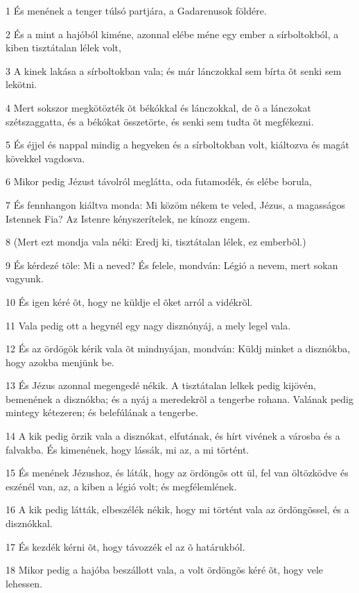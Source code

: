 \par 1 És menének a tenger túlsó partjára, a Gadarenusok földére.
\par 2 És a mint a hajóból kiméne, azonnal elébe méne egy ember a sírboltokból, a kiben tisztátalan lélek volt,
\par 3 A kinek lakása a sírboltokban vala; és már lánczokkal sem bírta õt senki sem lekötni.
\par 4 Mert sokszor megkötözték õt békókkal és lánczokkal, de õ a lánczokat szétszaggatta, és a békókat összetörte, és senki sem tudta õt megfékezni.
\par 5 És éjjel és nappal mindig a hegyeken és a sírboltokban volt, kiáltozva és magát kövekkel vagdosva.
\par 6 Mikor pedig Jézust távolról meglátta, oda futamodék, és elébe borula,
\par 7 És fennhangon kiáltva monda: Mi közöm nékem te veled, Jézus, a magasságos Istennek Fia? Az Istenre kényszerítelek, ne kínozz engem.
\par 8 (Mert ezt mondja vala néki: Eredj ki, tisztátalan lélek, ez emberbõl.)
\par 9 És kérdezé tõle: Mi a neved? És felele, mondván: Légió a nevem, mert sokan vagyunk.
\par 10 És igen kéré õt, hogy ne küldje el õket arról a vidékrõl.
\par 11 Vala pedig ott a hegynél egy nagy disznónyáj, a mely legel vala.
\par 12 És az ördögök kérik vala õt mindnyájan, mondván: Küldj minket a disznókba, hogy azokba menjünk be.
\par 13 És Jézus azonnal megengedé nékik. A tisztátalan lelkek pedig kijövén, bemenének a disznókba; és a nyáj a meredekrõl a tengerbe rohana. Valának pedig mintegy kétezeren; és belefúlának a tengerbe.
\par 14 A kik pedig õrzik vala a disznókat, elfutának, és hírt vivének a városba és a falvakba. És kimenének, hogy lássák, mi az, a mi történt.
\par 15 És menének Jézushoz, és láták, hogy az ördöngõs ott ül, fel van öltözködve és eszénél van, az, a kiben a légió volt; és megfélemlének.
\par 16 A kik pedig látták, elbeszélék nékik, hogy mi történt vala az ördöngõssel, és a disznókkal.
\par 17 És kezdék kérni õt, hogy távozzék el az õ határukból.
\par 18 Mikor pedig a hajóba beszállott vala, a volt ördöngõs kéré õt, hogy vele lehessen.
